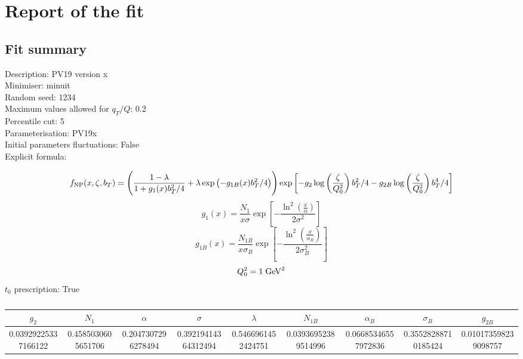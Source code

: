 \documentclass[
]{article}
\date{}
\begin{document}
\hypertarget{report-of-the-fit}{%
\section{Report of the fit}\label{report-of-the-fit}}

\hypertarget{fit-summary}{%
\subsection{Fit summary}\label{fit-summary}}

Description: PV19 version x\\
Minimiser: minuit\\
Random seed: 1234\\
Maximum values allowed for \(q_T / Q\): 0.2\\
Percentile cut: 5\\
Parameterisation: PV19x\\
Initial parameters fluctuations: False\\
Explicit formula:

\[f_{\rm NP}(x,\zeta, b_T)= \Biggl(
\frac{1-\lambda}{1 + g_1(x) b_T^2/4} + \lambda \exp \left(-g_{1B}(x) b_T^2 / 4 \right)\Biggr) \exp\left[- g_2 \log\left(\frac{\zeta}{Q_0^2}\right) b_T^2/4 - g_{2B} \log\left(\frac{\zeta}{Q_0^2}\right) b_T^4/4 \right]\]\[g_1(x) = \frac{N_1}{x\sigma} \exp\left[ - \frac{\ln^2\left(\frac{x}{\alpha}\right)}{2 \sigma^2} \right]\]\[g_{1B}(x) = \frac{N_{1B}}{x\sigma_B} \exp\left[ - \frac{\ln^2\left(\frac{x}{\alpha_B}\right)}{2 \sigma_B^2} \right]\]\[Q_0^2 = 1\;{\rm GeV}^2\]
\(t_0\) prescription: True

\begin{table}[h]

\centering

\begin{tabular}{|c|c|c|c|c|c|c|c|c|} \hline

\textbf{\(g_2\)} & \textbf{\(N_1\)} & \textbf{\(\alpha\)} & \textbf{\(\sigma\)} & \textbf{\(\lambda\)} & \textbf{\(N_{1B}\)} & \textbf{\(\alpha_B\)} & \textbf{\(\sigma_B\)} & \textbf{\(g_{2B}\)} \\ \hline

0.03929225337166122 & 0.4585030605651706 & 0.2047307296278494 & 0.39219414364312494 & 0.5466961452424751 & 0.03936952389514996 & 0.06685346557972836 & 0.35528288710185424 & 0.010173598239098757 \\ \hline

\end{tabular}

\caption{}

\end{table}
\end{document}
